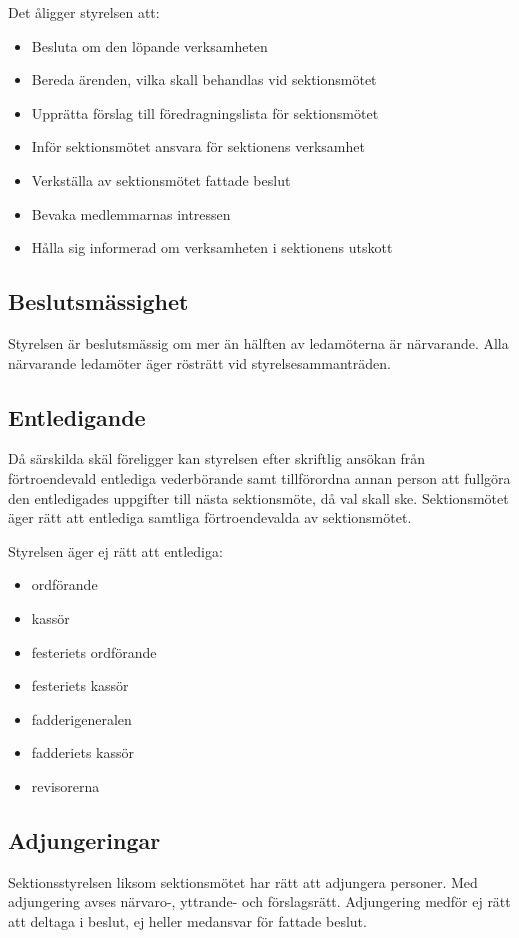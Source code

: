 \documentclass{datateknologsektionen-document}
\begin{document}
Det åligger styrelsen att:
\begin{itemize}
  \item Besluta om den löpande verksamheten
  \item Bereda ärenden, vilka skall behandlas vid sektionsmötet
  \item Upprätta förslag till föredragningslista för sektionsmötet
  \item Inför sektionsmötet ansvara för sektionens verksamhet
  \item Verkställa av sektionsmötet fattade beslut
  \item Bevaka medlemmarnas intressen
  \item Hålla sig informerad om verksamheten i sektionens utskott
\end{itemize}
\subsection{Beslutsmässighet}
Styrelsen är beslutsmässig om mer än hälften av ledamöterna är närvarande. Alla
närvarande ledamöter äger rösträtt vid styrelsesammanträden.
\subsection{Entledigande}
Då särskilda skäl föreligger kan styrelsen efter skriftlig ansökan från förtroendevald
entlediga vederbörande samt tillförordna annan person att fullgöra den entledigades
uppgifter till nästa sektionsmöte, då val skall ske. Sektionsmötet äger rätt att entlediga
samtliga förtroendevalda av sektionsmötet.

Styrelsen äger ej rätt att entlediga:
\begin{itemize}
  \item ordförande
  \item kassör
  \item festeriets ordförande
  \item festeriets kassör
  \item fadderigeneralen
  \item fadderiets kassör
  \item revisorerna
\end{itemize}
\subsection{Adjungeringar}
Sektionsstyrelsen liksom sektionsmötet har rätt att adjungera personer. Med adjungering
avses närvaro-, yttrande- och förslagsrätt. Adjungering medför ej rätt att deltaga i beslut,
ej heller medansvar för fattade beslut.
\end{document}
